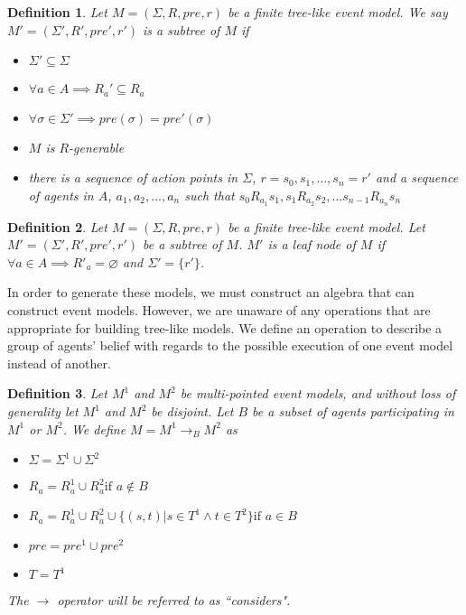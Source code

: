\documentclass[12pt, a4paper, titlepage]{scrartcl}
\newtheorem{defn}{Definition}
\begin{document}
\begin{defn} \label{subtree}
Let $M = (\Sigma, R, pre, r)$ be a finite tree-like event model.
We say $M' = (\Sigma', R', pre', r')$ is a subtree of $M$ if
\begin{itemize}
	\item $\Sigma' \subseteq \Sigma$
	\item $\forall a \in A \implies R_a' \subseteq R_a$
	\item $\forall \sigma \in \Sigma' \implies pre(\sigma) = pre'(\sigma) $
	\item $M$ is $R$-generable
	\item there is a sequence of action points in $\Sigma$, $r = s_0, s_1, \ldots, s_n = r'$ and a
	sequence of agents in $A$, $a_1, a_2, \ldots, a_n$ such that $s_0 R_{a_1} s_1, s_1 R_{a_2} s_2,
	\ldots s_{n-1} R_{a_n} s_n$
\end{itemize}
\end{defn}

\begin{defn} \label{leaf}
Let $M = (\Sigma, R, pre, r)$ be a finite tree-like event model.
Let $M' = (\Sigma', R', pre', r')$ be a subtree of $M$.
$M'$ is a leaf node of $M$ if $\forall a \in A \implies R'_a = \varnothing$ and $\Sigma' = \{ r'\}$.
\end{defn}

In order to generate these models, we must construct an algebra that can construct event models.
However, we are unaware of any operations that are appropriate for building tree-like models.
We define an operation to describe a group of agents' belief with regards to the possible execution
of one event model instead of another.

\begin{defn} \label{possOne}
Let $M^1$ and $M^2$ be multi-pointed event models, and without loss of
generality let $M^1$ and $M^2$ be disjoint.
Let $B$ be a subset of agents participating in $M^1$ or $M^2$.
We define $M = M^1 \to_B M^2$ as 
\begin{itemize}
  \item $\Sigma = \Sigma^1 \cup \Sigma^2$
  \item $R_a = R^1_a \cup R^2_a \text{if } a \notin B$
	\item $R_a =
      R^1_a \cup
      R^2_a \cup
      \{(s,t) | s \in T^1 \land t \in T^2 \}
    \text{if } a \in B $
  \item $pre = pre^1 \cup pre^2$
  \item $T = T^1$
\end{itemize}
The $\to$ operator will be referred to as ``considers".
\end{defn}
\end{document}
